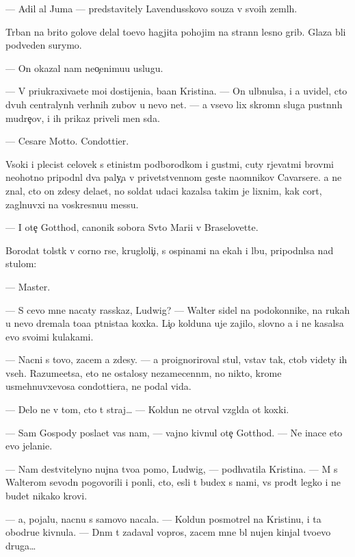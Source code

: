 \documentclass[10pt]{book}
\begin{document}
— Adil al Juma — predstavitely Lavendusskovo so{\y}uza v svo{\y}ih zeml{\ia}h.

T{\io}rban na brito{\y} golove delal to{\x}evo hagjita pohojim na strann{\yi}{\y} lesno{\y} grib. Glaza b{\yi}li podveden{\yi} surymo{\y}.

— On okazal nam neo{\c}enimu{\y}u uslugu.

— V{\yi} priukraxiva{\y}ete mo{\y}i dostijeni{\y}a, ba{\y}an Kristina. — On ul{\yi}bnulsa, i {\y}a uvidel, cto dvuh centralyn{\yi}h verhnih zubov u nevo net. — {\Y}a vsevo lix skromn{\yi}{\y} sluga pust{\yi}nn{\yi}h mudre{\c}ov, i ih prikaz{\yi} priveli men{\ia} s{\io}da.

— Cesare Motto. Condottier.

V{\yi}soki{\y} i plecist{\yi}{\y} celovek s {\x}etinist{\yi}m podborodkom i gust{\yi}mi, cuty r{\yi}jevat{\yi}mi brov{\ia}mi neohotno pripodn{\ia}l dva paly{\c}a v privetstvennom geste na{\y}omnikov Cavarsere. {\Y}a ne znal, cto on zdesy dela{\y}et, no soldat udaci kazalsa takim je lixnim, kak cort, zagl{\ia}nuvxi{\y} na voskresnu{\y}u messu.

— I ote{\c} Gotthod, canonik sobora Sv{\ia}to{\y} Mari{\y}i v Braselovette.

Borodat{\yi}{\y} tolst{\ia}k v corno{\y} r{\ia}se, krugloli{\c}i{\y}, s ospinami na {\x}ekah i lbu, pripodn{\ia}lsa nad stulom:

— Master.

— S cevo mne nacaty rasskaz, Ludwig? — Walter sidel na podokonnike, na rukah u nevo dremala to{\x}a{\y}a p{\ia}tnista{\y}a koxka. Li{\c}o kolduna uje zajilo, slovno {\y}a i ne kasalsa {\y}evo svo{\y}imi kulakami.

— Nacni s tovo, zacem {\y}a zdesy. — {\Y}a proignoriroval stul, vstav tak, ctob{\yi} videty ih vseh. Razume{\y}etsa, eto ne ostalosy nezamecenn{\yi}m, no nikto, krome usmehnuvxevosa condottiera, ne podal vida.

— Delo ne v tom, cto t{\yi} straj… — Koldun ne otr{\yi}val vzgl{\ia}da ot koxki.

— Sam Gospody pos{\yi}la{\y}et vas nam, — vajno kivnul ote{\c} Gotthod. — Ne inace eto {\y}evo jelani{\y}e.

— Nam de{\y}stvitelyno nujna tvo{\y}a pomo{\x}, Ludwig, — podhvatila Kristina. — M{\yi} s Walterom sevodn{\ia} pogovorili i pon{\ia}li, cto, {\y}esli t{\yi} budex s nami, vs{\e} pro{\y}d{\e}t legko i ne budet nikako{\y} krovi.

— {\Y}a, pojalu{\y}, nacnu s samovo nacala. — Koldun posmotrel na Kristinu, i ta obodr{\ia}{\y}u{\x}e kivnula. — Dn{\e}m t{\yi} zadaval vopros, zacem mne b{\yi}l nujen kinjal tvo{\y}evo druga…
\end{document}
